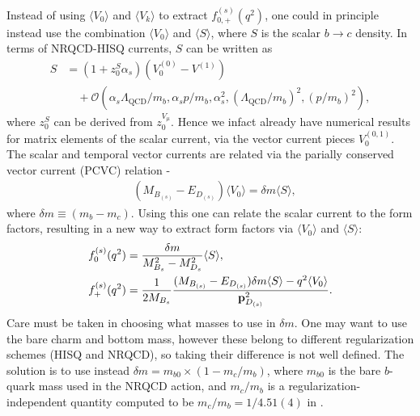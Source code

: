 Instead of using $\langle V_0 \rangle$ and $\langle V_k \rangle$ to extract $f^{(s)}_{0,+}(q^2)$, one could in principle instead use the combination $\langle V_0 \rangle$ and $\langle S \rangle$, where $S$ is the scalar $b\to c$ density. In terms of NRQCD-HISQ currents, $S$ can be written as
\begin{align}
  S &= (1+z_0^S\alpha_s)( V^{(0)}_0 - V^{(1)} ) \\ \nonumber &\quad + \mathcal{O}( \alpha_s \Lambda_{\text{QCD}} / m_b, \alpha_s p/m_b,  \alpha_s^2, (\Lambda_{\text{QCD}}/m_b)^2, (p/m_b)^2 ),
\end{align}
where $z_0^S$ can be derived from $z_0^{V_{\mu}}$. Hence we infact already have numerical results for matrix elements of the scalar current, via the vector current pieces $V^{(0,1)}_0$. The scalar and temporal vector currents are related via the parially conserved vector current (PCVC) relation -
\begin{align}
  &(M_{B_{(s)}}-E_{D_{(s)}})\langle V_0 \rangle = \delta m \langle S \rangle,
\end{align}
where $\delta m \equiv (m_b-m_c)$. Using this one can relate the scalar current to the form factors, resulting in a new way to extract form factors via $\langle V_0 \rangle$ and $\langle S \rangle$:
\begin{align}
  f_0^{(s)}(q^2) &= {\delta m\over M_{B_s}^2 - M_{D_s}^2 } \langle S \rangle, \\
  f_+^{(s)}(q^2) &= {1\over 2M_{B_s}} { (M_{B_{(s)}}-E_{D_{(s)}}) \delta m \langle S \rangle - q^2 \langle V_0 \rangle \over {\bf{p}}^2_{D_{(s)}}}. \label{eq:fplus_badness}
\end{align}
Care must be taken in choosing what masses to use in $\delta m$. One may want to use the bare charm and bottom mass, however these belong to different regularization schemes (HISQ and NRQCD), so taking their difference is not well defined. The solution is to use instead $\delta m = m_{b0} \times ( 1 - m_c/m_b)$, where $m_{b0}$ is the bare $b$-quark mass used in the NRQCD action, and $m_c/m_b$ is a regularization-independent quantity computed to be $m_c/m_b = 1/4.51(4)$ in \cite{McNeile:2010ji}.

